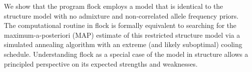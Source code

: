
      We show that the program {\sc flock} \citep{Duc&Tur2009} employs 
a model that is identical to the {\sc structure} 
\citep{Pritchardetal2000} model with no admixture and non-correlated 
allele frequency priors. The computational routine in {\sc flock} is 
formally equivalent to searching for the maximum-a-posteriori (MAP) 
estimate of this restricted {\sc structure} model via a simulated 
annealing algorithm with an extreme (and likely suboptimal) cooling 
schedule.  Understanding {\sc flock} as a special case of the model in 
{\sc structure} allows a principled perspective on its expected 
strengths and weaknesses. 

